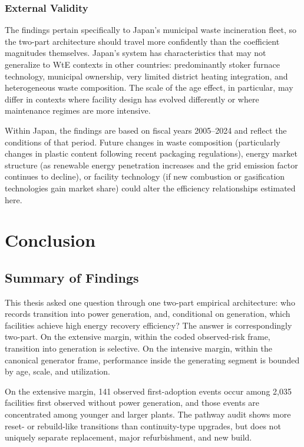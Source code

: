 \documentclass[12pt,a4paper]{article}
\begin{document}
\subsubsection{External Validity}

The findings pertain specifically to Japan's municipal waste incineration fleet, so the two-part architecture should travel more confidently than the coefficient magnitudes themselves. Japan's system has characteristics that may not generalize to WtE contexts in other countries: predominantly stoker furnace technology, municipal ownership, very limited district heating integration, and heterogeneous waste composition. The scale of the age effect, in particular, may differ in contexts where facility design has evolved differently or where maintenance regimes are more intensive.

Within Japan, the findings are based on fiscal years 2005--2024 and reflect the conditions of that period. Future changes in waste composition (particularly changes in plastic content following recent packaging regulations), energy market structure (as renewable energy penetration increases and the grid emission factor continues to decline), or facility technology (if new combustion or gasification technologies gain market share) could alter the efficiency relationships estimated here.


\clearpage
\section{Conclusion}

\subsection{Summary of Findings}

This thesis asked one question through one two-part empirical architecture: who records transition into power generation, and, conditional on generation, which facilities achieve high energy recovery efficiency? The answer is correspondingly two-part. On the extensive margin, within the coded observed-risk frame, transition into generation is selective. On the intensive margin, within the canonical generator frame, performance inside the generating segment is bounded by age, scale, and utilization.

On the extensive margin, 141 observed first-adoption events occur among 2,035 facilities first observed without power generation, and those events are concentrated among younger and larger plants. The pathway audit shows more reset- or rebuild-like transitions than continuity-type upgrades, but does not uniquely separate replacement, major refurbishment, and new build.
\end{document}
